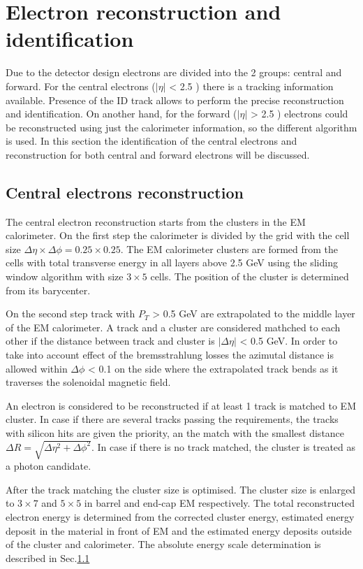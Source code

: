 \section{Electron reconstruction and identification}

Due to the detector design electrons are divided into the 2 groups: central and forward. For the central electrons ($| \eta |$ < 2.5 ) there is a tracking information available. Presence of the ID track allows to perform the precise reconstruction and identification. On another hand, for the forward  ($| \eta |$ > 2.5 ) electrons could be reconstructed using just the calorimeter information, so the different algorithm is used. In this section the identification of the central electrons and reconstruction for both central and forward electrons will be discussed.

\subsection{Central electrons reconstruction}
The central electron reconstruction starts from the clusters in the EM calorimeter. On the first step the calorimeter is divided by the grid with the cell size $\Delta \eta \times \Delta \phi = 0.25 \times 0.25$. The EM calorimeter clusters are formed from the cells with total transverse energy in all layers above 2.5 GeV using the sliding window algorithm\cite{ElecClust} with size $3\times5$ cells. The position of the cluster is determined from its barycenter.

On the second step track with $P_{T}$ > 0.5 GeV are extrapolated to the middle layer of the EM calorimeter. A track and a cluster are considered mathched to each other if the distance between track and cluster is $|\Delta\eta|$ < 0.5 GeV. In order to take into account effect of the bremsstrahlung losses the azimutal distance is allowed within $\Delta\phi$ < 0.1 on the side where the extrapolated track bends as it traverses the solenoidal magnetic field.

An electron is considered to be reconstructed if at least 1 track is matched to EM cluster. In case if there are several tracks passing the requirements, the tracks with silicon hits are given the priority, an the match with the smallest distance $\Delta R = \sqrt{\Delta\eta^2+\Delta\phi^2}$. In case if there is no track matched, the cluster is treated as a photon candidate.

After the track matching the cluster size is optimised. The cluster size is enlarged to $3\times7$ and $5\times5$ in barrel and end-cap EM respectively. The total reconstructed electron energy is determined from the corrected cluster energy, estimated energy deposit in the material in front of EM and the estimated energy deposits outside of the cluster and calorimeter. The absolute energy scale determination is described in Sec.\ref{}
